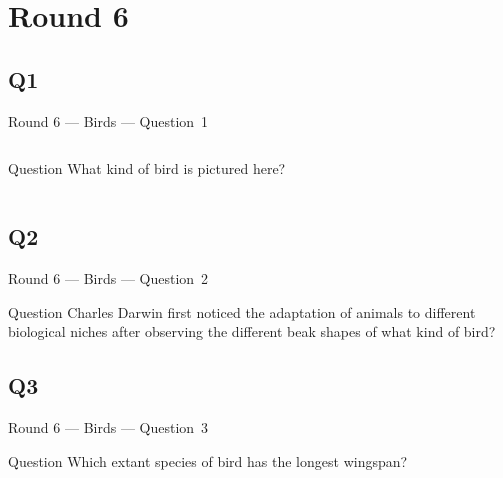 \documentclass[11pt]{beamer}
\begin{document}
\section{Round 6}
\subsection*{Q1}
\begin{frame}[t]{Round 6 --- Birds --- \mbox{Question 1}}
    \vspace{-0.5em}
    \begin{columns}[T,totalwidth=\linewidth]
        \begin{column}{0.32\linewidth}
            \begin{block}{Question}
                What kind of bird is pictured here?
            \end{block}
        \end{column}
        \begin{column}{0.65\linewidth}
            \begin{center}
                \texttt{[image: \{Images/starling]}.jpg}
            \end{center}
        \end{column}
    \end{columns}
\end{frame}
\subsection*{Q2}
\begin{frame}[t]{Round 6 --- Birds --- \mbox{Question 2}}
    \vspace{-0.5em}
    \begin{block}{Question}
        Charles Darwin first noticed the adaptation of animals to different biological niches after observing the different beak shapes of what kind of bird?
    \end{block}
\end{frame}
\subsection*{Q3}
\begin{frame}[t]{Round 6 --- Birds --- \mbox{Question 3}}
    \vspace{-0.5em}
    \begin{block}{Question}
        Which extant species of bird has the longest wingspan?
    \end{block}
\end{frame}
\end{document}
